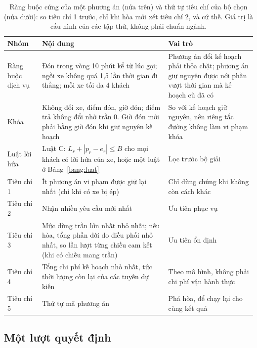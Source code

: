 \begin{table}[htbp]
\centering
\caption{Ràng buộc cứng của một phương án (nửa trên) và thứ tự tiêu chí của bộ chọn (nửa dưới): so tiêu chí 1
trước, chỉ khi hòa mới xét tiêu chí 2, và cứ thế. Giá trị là cấu hình của các tập thử, không phải chuẩn ngành.}
\label{bang:rangbuoc}
\small
\begin{tabular}{@{}p{2.4cm}p{7.6cm}p{4.8cm}@{}}
\toprule
\textbf{Nhóm} & \textbf{Nội dung} & \textbf{Vai trò}\\
\midrule
Ràng buộc dịch vụ & Đón trong vòng 10 phút kể từ lúc gọi; ngồi xe không quá 1,5 lần thời gian đi thẳng; mỗi
xe tối đa 4 khách & Phương án đổi kế hoạch phải thỏa chặt; phương án giữ nguyên được nới phần vượt thời gian
mà kế hoạch cũ đã có\\
Khóa & Không đổi xe, điểm đón, giờ đón; điểm trả không đổi nhờ trần 0. Giờ đón mới phải bằng giờ đón khi giữ
nguyên kế hoạch & So với kế hoạch giữ nguyên, nên riêng tắc đường không làm vi phạm khóa\\
Luật lời hứa & Luật C: $L_r + |p_r - e_r| \le B$ cho mọi khách có lời hứa của xe, hoặc một luật ở
Bảng~\ref{bang:luat} & Lọc trước bộ giải\\
\midrule
Tiêu chí 1 & Ít phương án vi phạm được giữ lại nhất (chỉ khi có xe bị ép) & Chỉ dùng chúng khi không còn cách
khác\\
Tiêu chí 2 & Nhận nhiều yêu cầu mới nhất & Ưu tiên phục vụ\\
Tiêu chí 3 & Mức dùng trần lớn nhất nhỏ nhất; nếu hòa, tổng phần dời do điều phối nhỏ nhất, so lần lượt từng
chiều cam kết (khi có chiều mang trần) & Ưu tiên ổn định\\
Tiêu chí 4 & Tổng chi phí kế hoạch nhỏ nhất, tức thời lượng còn lại của các tuyến dự kiến & Theo mô hình, không
phải chi phí vận hành thực\\
Tiêu chí 5 & Thứ tự mã phương án & Phá hòa, để chạy lại cho cùng kết quả\\
\bottomrule
\end{tabular}
\end{table}

\subsection{Một lượt quyết định}
\label{muc:luotquyetdinh}

